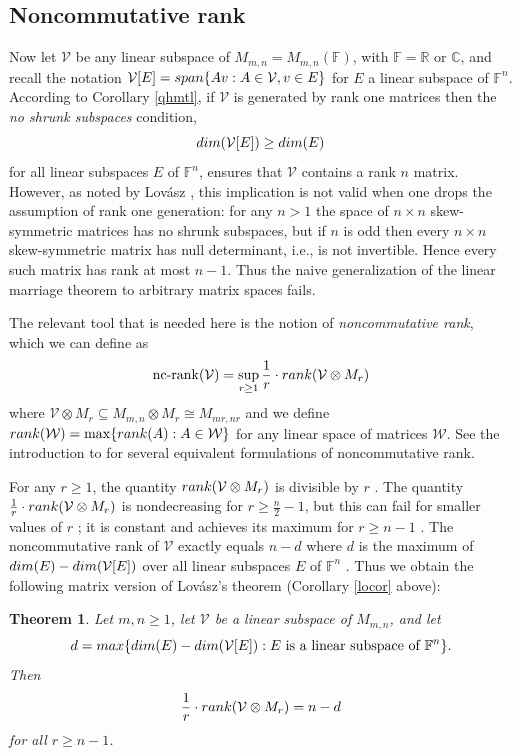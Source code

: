 \documentclass[10pt,a4paper]{amsart}
\newtheorem{thm}{Theorem}[section]
\newcommand\ncrank{\operatorname{nc-rank}}
\begin{document}
\subsection{Noncommutative rank}

Now let $\mathcal{V}$ be any linear subspace of $M_{m,n} = M_{m,n}(\mathbb{F})$, with $\mathbb{F} = \mathbb{R}$ or $\mathbb{C}$, and recall the notation $\mathcal{V}[E] = {\rm span}\{Av: A \in \mathcal{V}, v \in E\}$ for $E$ a linear subspace of $\mathbb{F}^n$. According to Corollary \ref{qhmtl}, if $\mathcal{V}$ is generated by rank one matrices then the {\it no shrunk subspaces} condition, $${\rm dim}(\mathcal{V}[E]) \geq {\rm dim}(E)$$ for all linear subspaces $E$ of $\mathbb{F}^n$, ensures that $\mathcal{V}$ contains a rank $n$ matrix. However, as noted by Lovász \cite{lovasz}, this implication is not valid when one drops the assumption of rank one generation: for any $n > 1$ the space of $n\times n$ skew-symmetric matrices has no shrunk subspaces, but if $n$ is odd then every $n \times n$ skew-symmetric matrix has null determinant, i.e., is not invertible. Hence every such matrix has rank at most $n - 1$. Thus the naive generalization of the linear marriage theorem to arbitrary matrix spaces fails.

The relevant tool that is needed here is the notion of {\it noncommutative rank}, which we can define as $$\ncrank(\mathcal{V}) = \sup_{r \geq 1} \frac{1}{r} \cdot {\rm rank}(\mathcal{V} \otimes M_r)$$ where $\mathcal{V}\otimes M_r \subseteq M_{m,n}\otimes M_r \cong M_{mr,nr}$ and we define ${\rm rank}(\mathcal{W}) = \max\{{\rm rank}(A): A \in \mathcal{W}\}$ for any linear space of matrices $\mathcal{W}$. See the introduction to \cite{IQS} for several equivalent formulations of noncommutative rank.

For any $r \geq 1$, the quantity ${\rm rank}(\mathcal{V} \otimes M_r)$ is divisible by $r$ \cite[Lemma 5.6]{IQS0}. The quantity $\frac{1}{r}\cdot {\rm rank}(\mathcal{V} \otimes M_r)$ is nondecreasing for $r \geq \frac{n}{2} - 1$, but this can fail for smaller values of $r$ \cite[Propositions 1.12 and 1.13]{DM1}; it is constant and achieves its maximum for $r \geq n -1$ \cite[Theorem 1.8]{DM}. The noncommutative rank of $\mathcal{V}$ exactly equals $n - d$ where $d$ is the maximum of ${\rm dim}(E) - {\rm dim}(\mathcal{V}[E])$ over all linear subspaces $E$ of $\mathbb{F}^n$ \cite[Theorem 1]{FR}. Thus we obtain the following matrix version of Lovász's theorem (Corollary \ref{locor} above):

\begin{thm}\label{ncr}
Let $m,n \geq 1$, let $\mathcal{V}$ be a linear subspace of $M_{m,n}$, and let $$d = {\rm max}\{{\rm dim}(E) - {\rm dim}(\mathcal{V}[E]): E\mbox{ is a linear subspace of }\mathbb{F}^n\}.$$ Then $$\frac{1}{r}\cdot {\rm rank}(\mathcal{V}\otimes M_r) = n - d$$ for all $r \geq n-1$.
\end{thm}
\end{document}
